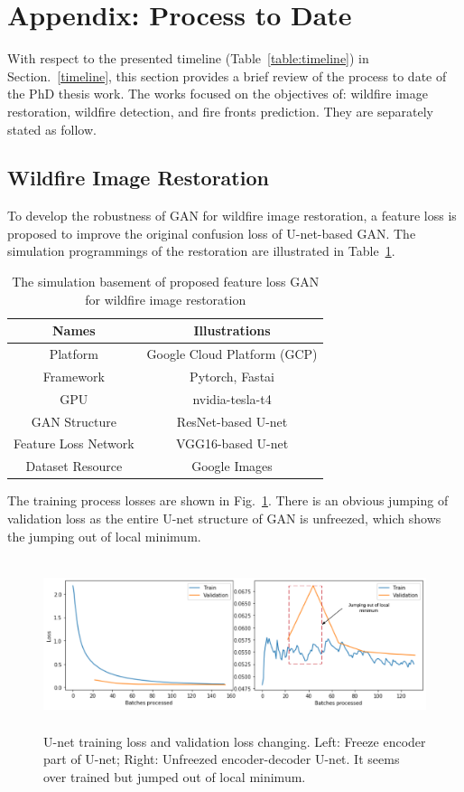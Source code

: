 \section{Appendix: Process to Date}
With respect to the presented timeline (Table~\ref{table:timeline}) in Section.~\ref{timeline}, this section provides a brief review of the process to date of the PhD thesis work. The works focused on the objectives of: wildfire image restoration, wildfire detection, and fire fronts prediction. They are separately stated as follow.
\subsection{Wildfire Image Restoration}
To develop the robustness of GAN for wildfire image restoration, a feature loss is proposed to improve the original confusion loss of U-net-based GAN. The simulation programmings of the restoration are illustrated in Table~\ref{table:GANprogram}.
\begin{table}[ht]
\caption{The simulation basement of proposed feature loss GAN for wildfire image restoration}
\label{table:GANprogram}
    \centering
    \small
    \begin{tabular}{c c}
    \toprule
        Names & Illustrations\\
        \hline
        \rowcolor{mygray}
        Platform & Google Cloud Platform (GCP)\\
        Framework &  Pytorch, Fastai\\
        \rowcolor{mygray}
        GPU & nvidia-tesla-t4\\
        GAN Structure & ResNet-based U-net\\
        \rowcolor{mygray}
        Feature Loss Network& VGG16-based U-net\\
        Dataset Resource& Google Images \\
    \bottomrule
    \end{tabular}
\end{table}\par
The training process losses are shown in Fig.~\ref{fig:GANlosscompare}. There is an obvious jumping of validation loss as the entire U-net structure of GAN is unfreezed, which shows the jumping out of local minimum.
\begin{figure}[ht]
\centering
\includegraphics[height=50mm]{figs/GANlosscompare.pdf}
\caption{U-net training loss and validation loss changing. Left: Freeze encoder part of U-net; Right: Unfreezed encoder-decoder U-net. It seems over trained but jumped out of local minimum.}
\label{fig:GANlosscompare}
\end{figure}\par
